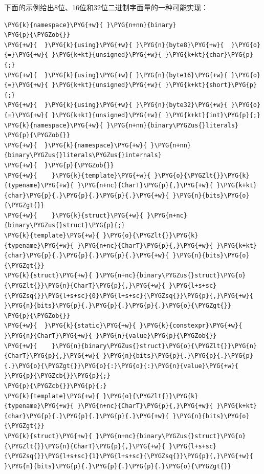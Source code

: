 
下面的示例给出8位、16位和32位二进制字面量的一种可能实现：



\begin{codeblockbg}
\begin{Verbatim}[commandchars=\\\{\},breaklines=true,breakanywhere=true,fontsize=\codefont,xleftmargin=17bp]
\PYG{k}{namespace}\PYG{+w}{ }\PYG{n+nn}{binary}
\PYG{p}{\PYGZob{}}
\PYG{+w}{  }\PYG{k}{using}\PYG{+w}{ }\PYG{n}{byte8}\PYG{+w}{  }\PYG{o}{=}\PYG{+w}{ }\PYG{k+kt}{unsigned}\PYG{+w}{ }\PYG{k+kt}{char}\PYG{p}{;}
\PYG{+w}{  }\PYG{k}{using}\PYG{+w}{ }\PYG{n}{byte16}\PYG{+w}{ }\PYG{o}{=}\PYG{+w}{ }\PYG{k+kt}{unsigned}\PYG{+w}{ }\PYG{k+kt}{short}\PYG{p}{;}
\PYG{+w}{  }\PYG{k}{using}\PYG{+w}{ }\PYG{n}{byte32}\PYG{+w}{ }\PYG{o}{=}\PYG{+w}{ }\PYG{k+kt}{unsigned}\PYG{+w}{ }\PYG{k+kt}{int}\PYG{p}{;}
\PYG{k}{namespace}\PYG{+w}{ }\PYG{n+nn}{binary\PYGZus{}literals}
\PYG{p}{\PYGZob{}}
\PYG{+w}{  }\PYG{k}{namespace}\PYG{+w}{ }\PYG{n+nn}{binary\PYGZus{}literals\PYGZus{}internals}
\PYG{+w}{  }\PYG{p}{\PYGZob{}}
\PYG{+w}{    }\PYG{k}{template}\PYG{+w}{ }\PYG{o}{\PYGZlt{}}\PYG{k}{typename}\PYG{+w}{ }\PYG{n+nc}{CharT}\PYG{p}{,}\PYG{+w}{ }\PYG{k+kt}{char}\PYG{p}{.}\PYG{p}{.}\PYG{p}{.}\PYG{+w}{ }\PYG{n}{bits}\PYG{o}{\PYGZgt{}}
\PYG{+w}{    }\PYG{k}{struct}\PYG{+w}{ }\PYG{n+nc}{binary\PYGZus{}struct}\PYG{p}{;}
\PYG{k}{template}\PYG{+w}{ }\PYG{o}{\PYGZlt{}}\PYG{k}{typename}\PYG{+w}{ }\PYG{n+nc}{CharT}\PYG{p}{,}\PYG{+w}{ }\PYG{k+kt}{char}\PYG{p}{.}\PYG{p}{.}\PYG{p}{.}\PYG{+w}{ }\PYG{n}{bits}\PYG{o}{\PYGZgt{}}
\PYG{k}{struct}\PYG{+w}{ }\PYG{n+nc}{binary\PYGZus{}struct}\PYG{o}{\PYGZlt{}}\PYG{n}{CharT}\PYG{p}{,}\PYG{+w}{ }\PYG{l+s+sc}{\PYGZsq{}}\PYG{l+s+sc}{0}\PYG{l+s+sc}{\PYGZsq{}}\PYG{p}{,}\PYG{+w}{ }\PYG{n}{bits}\PYG{p}{.}\PYG{p}{.}\PYG{p}{.}\PYG{o}{\PYGZgt{}}
\PYG{p}{\PYGZob{}}
\PYG{+w}{  }\PYG{k}{static}\PYG{+w}{ }\PYG{k}{constexpr}\PYG{+w}{ }\PYG{n}{CharT}\PYG{+w}{ }\PYG{n}{value}\PYG{p}{\PYGZob{}}
\PYG{+w}{    }\PYG{n}{binary\PYGZus{}struct}\PYG{o}{\PYGZlt{}}\PYG{n}{CharT}\PYG{p}{,}\PYG{+w}{ }\PYG{n}{bits}\PYG{p}{.}\PYG{p}{.}\PYG{p}{.}\PYG{o}{\PYGZgt{}}\PYG{o}{:}\PYG{o}{:}\PYG{n}{value}\PYG{+w}{ }\PYG{p}{\PYGZcb{}}\PYG{p}{;}
\PYG{p}{\PYGZcb{}}\PYG{p}{;}
\PYG{k}{template}\PYG{+w}{ }\PYG{o}{\PYGZlt{}}\PYG{k}{typename}\PYG{+w}{ }\PYG{n+nc}{CharT}\PYG{p}{,}\PYG{+w}{ }\PYG{k+kt}{char}\PYG{p}{.}\PYG{p}{.}\PYG{p}{.}\PYG{+w}{ }\PYG{n}{bits}\PYG{o}{\PYGZgt{}}
\PYG{k}{struct}\PYG{+w}{ }\PYG{n+nc}{binary\PYGZus{}struct}\PYG{o}{\PYGZlt{}}\PYG{n}{CharT}\PYG{p}{,}\PYG{+w}{ }\PYG{l+s+sc}{\PYGZsq{}}\PYG{l+s+sc}{1}\PYG{l+s+sc}{\PYGZsq{}}\PYG{p}{,}\PYG{+w}{ }\PYG{n}{bits}\PYG{p}{.}\PYG{p}{.}\PYG{p}{.}\PYG{o}{\PYGZgt{}}

\end{Verbatim}
\end{codeblockbg}
